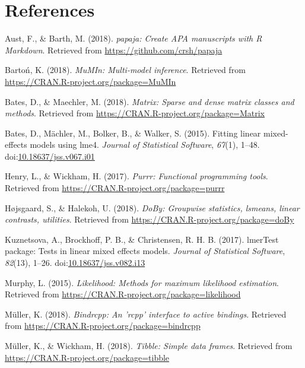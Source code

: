 \documentclass[man]{apa6}
\theoremstyle{definition}
\theoremstyle{definition}
\theoremstyle{definition}
\theoremstyle{remark}
\begin{document}
\newpage

\section{References}\label{references}

\begingroup
\setlength{\parindent}{-0.5in} \setlength{\leftskip}{0.5in}

\hypertarget{refs}{}
\hypertarget{ref-R-papaja}{}
Aust, F., \& Barth, M. (2018). \emph{papaja: Create APA manuscripts with
R Markdown}. Retrieved from \url{https://github.com/crsh/papaja}

\hypertarget{ref-R-MuMIn}{}
Bartoń, K. (2018). \emph{MuMIn: Multi-model inference}. Retrieved from
\url{https://CRAN.R-project.org/package=MuMIn}

\hypertarget{ref-R-Matrix}{}
Bates, D., \& Maechler, M. (2018). \emph{Matrix: Sparse and dense matrix
classes and methods}. Retrieved from
\url{https://CRAN.R-project.org/package=Matrix}

\hypertarget{ref-R-lme4}{}
Bates, D., Mächler, M., Bolker, B., \& Walker, S. (2015). Fitting linear
mixed-effects models using lme4. \emph{Journal of Statistical Software},
\emph{67}(1), 1--48.
doi:\href{https://doi.org/10.18637/jss.v067.i01}{10.18637/jss.v067.i01}

\hypertarget{ref-R-purrr}{}
Henry, L., \& Wickham, H. (2017). \emph{Purrr: Functional programming
tools}. Retrieved from \url{https://CRAN.R-project.org/package=purrr}

\hypertarget{ref-R-doBy}{}
Højsgaard, S., \& Halekoh, U. (2018). \emph{DoBy: Groupwise statistics,
lsmeans, linear contrasts, utilities}. Retrieved from
\url{https://CRAN.R-project.org/package=doBy}

\hypertarget{ref-R-lmerTest}{}
Kuznetsova, A., Brockhoff, P. B., \& Christensen, R. H. B. (2017).
lmerTest package: Tests in linear mixed effects models. \emph{Journal of
Statistical Software}, \emph{82}(13), 1--26.
doi:\href{https://doi.org/10.18637/jss.v082.i13}{10.18637/jss.v082.i13}

\hypertarget{ref-R-likelihood}{}
Murphy, L. (2015). \emph{Likelihood: Methods for maximum likelihood
estimation}. Retrieved from
\url{https://CRAN.R-project.org/package=likelihood}

\hypertarget{ref-R-bindrcpp}{}
Müller, K. (2018). \emph{Bindrcpp: An 'rcpp' interface to active
bindings}. Retrieved from
\url{https://CRAN.R-project.org/package=bindrcpp}

\hypertarget{ref-R-tibble}{}
Müller, K., \& Wickham, H. (2018). \emph{Tibble: Simple data frames}.
Retrieved from \url{https://CRAN.R-project.org/package=tibble}
\end{document}
